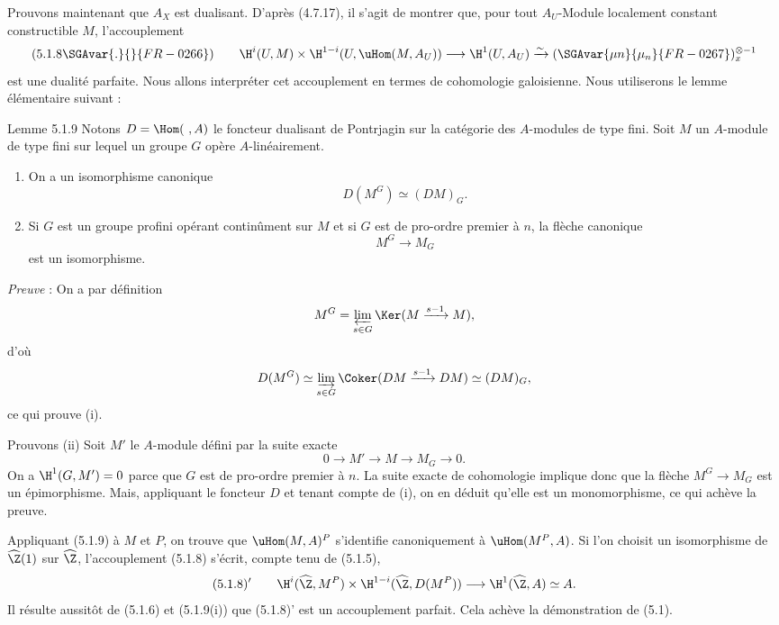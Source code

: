 Prouvons maintenant que $A_X$ est dualisant. D'après (4.7.17), il s'agit de montrer que, pour tout $A_U$-Module localement constant constructible $M$, l'accouplement
\[
(5.1.8\SGAvar{.}{}{FR-0266})\qquad \H^i(U,M)\times\H^{1-i}(U,\uHom(M,A_U))\longrightarrow \H^1(U,A_U)\xrightarrow{\sim}(\SGAvar{\mu n}{\mu_n}{FR-0267})_x^{\otimes -1}\]
est une dualité parfaite. Nous allons interpréter cet accouplement en termes de cohomologie galoisienne. Nous utiliserons le lemme élémentaire suivant :

\begin{statement}{Lemme 5.1.9}
Notons $D=\Hom(\ ,A)$ le foncteur dualisant de Pontrjagin sur la catégorie des $A$-modules de type fini. Soit $M$ un $A$-module de type fini sur lequel un groupe $G$ opère $A$-linéairement.
\begin{enumerate}[label=(\roman*)]
\item On a un isomorphisme canonique
\[
D(M^G)\simeq (DM)_G.
\]
\item Si $G$ est un groupe profini opérant continûment sur $M$ et si $G$ est de pro-ordre premier à $n$, la flèche canonique
\[
M^G\longrightarrow M_G
\]
est un isomorphisme.
\end{enumerate}
\end{statement}

\emph{Preuve} : On a par définition
\[
M^G=\varprojlim_{s\in G}\Ker(M\xrightarrow{s-1}M),
\]
d'où
\[
D(M^G)\simeq \varinjlim_{s\in G}\Coker(DM\xrightarrow{s-1}DM)\simeq (DM)_G,
\]
ce qui prouve (i).

Prouvons (ii) Soit $M'$ le $A$-module défini par la suite exacte
\[
0\longrightarrow M'\longrightarrow M\longrightarrow M_G\longrightarrow0.
\]
On a $\H^1(G,M')=0$ parce que $G$ est de pro-ordre premier à $n$. La suite exacte de cohomologie implique donc que la flèche $M^G\to M_G$ est un épimorphisme. Mais, appliquant le foncteur $D$ et tenant compte de (i), on en déduit qu'elle est un monomorphisme, ce qui achève la preuve.

Appliquant (5.1.9) à $M$ et $P$, on trouve que $\uHom(M,A)^P$ s'identifie canoniquement à $\uHom(M^P,A)$. Si l'on choisit un isomorphisme de $\widehat{\Z}(1)$ sur $\widehat{\Z}$, l'accouplement (5.1.8) s'écrit, compte tenu de (5.1.5),
\[
(5.1.8)'\qquad \H^i(\widehat{\Z},M^P)\times\H^{1-i}(\widehat{\Z},D(M^P))\longrightarrow\H^1(\widehat{\Z},A)\simeq A.
\]
Il résulte aussitôt de (5.1.6) et (5.1.9(i)) que (5.1.8)' est un accouplement parfait. Cela achève la démonstration de (5.1).

